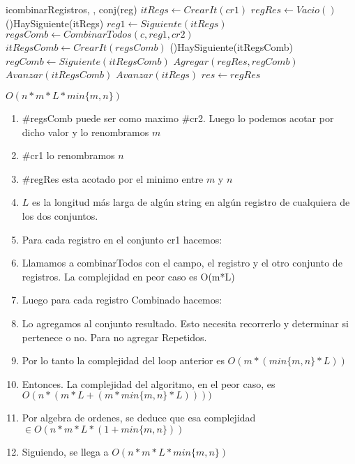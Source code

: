 \begin{Algoritmos}
\begin{algoritmo}{icombinarRegistros}{, , }{conj(reg)}
	$itRegs \gets CrearIt(cr1)$   	
	$regRes \gets Vacio()$    
	\While(){HaySiguiente(itRegs)}{
        $reg1 \gets Siguiente(itRegs) $    
    	$regsComb \gets CombinarTodos(c,reg1, cr2) $    
        $itRegsComb \gets CrearIt(regsComb)$   	
        \While(){HaySiguiente(itRegsComb)}{
        	$regComb \gets Siguiente(itRegsComb)$    
        	$Agregar(regRes, regComb) $    
			$Avanzar(itRegsComb) $ 
        }
		$Avanzar(itRegs) $ 
    }
    $res \gets regRes $ 
\end{algoritmo}
\datosAlgoritmo{} %
  {} %
  {} %
  {$O(n*m*L*min\lbrace m, n \rbrace)$} %
  {\begin{enumerate}
  	\item $\#$regsComb puede ser como maximo \#cr2. Luego lo podemos acotar por dicho valor y lo renombramos $m$
    \item $\#$cr1 lo renombramos $n$
    \item $\#$regRes esta acotado por el minimo entre $m$ y $n$
    \item $L$ es la longitud m\'as larga de alg\'un string en alg\'un registro de cualquiera de los dos conjuntos.
  	\item Para cada registro en el conjunto cr1 hacemos:
    \item Llamamos a combinarTodos con el campo, el registro y el otro conjunto de registros. La complejidad en peor caso es O(m*L)
    \item Luego para cada registro Combinado hacemos:
    \item Lo agregamos al conjunto resultado. Esto necesita recorrerlo y determinar si pertenece o no. Para no agregar Repetidos.
    \item Por lo tanto la complejidad del loop anterior es $O(m*(min\lbrace m,n \rbrace*L))$
    \item Entonces. La complejidad del algoritmo, en el peor caso, es  $O(n*(m*L + (m*min\lbrace m,n \rbrace *L))))$
    \item Por algebra de ordenes, se deduce que esa complejidad $ \in O(n*m*L*(1+min\lbrace m, n \rbrace)) $
    \item Siguiendo, se llega a $ O(n*m*L*min\lbrace m, n \rbrace) $ 
	\end{enumerate} 
    } %


\end{Algoritmos}
